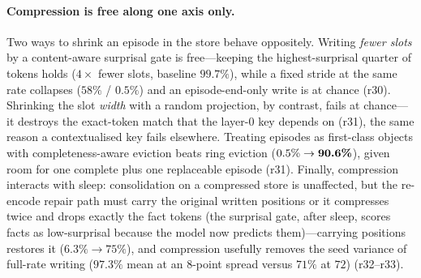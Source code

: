\paragraph{Compression is free along one axis only.} Two ways to shrink an episode in
the store behave oppositely. Writing \emph{fewer slots} by a content-aware surprisal gate
is free---keeping the highest-surprisal quarter of tokens holds 
($4\times$ fewer slots, baseline $99.7\%$), while a fixed stride at the same rate
collapses ($58\%$ / $0.5\%$) and an episode-end-only write is at chance (r30). Shrinking
the slot \emph{width} with a random projection, by contrast, fails at chance---it
destroys the exact-token match that the layer-0 key depends on (r31), the same reason a
contextualised key fails elsewhere. Treating episodes as first-class objects with
completeness-aware eviction beats ring eviction ($0.5\%\to\textbf{90.6\%}$), given room for
one complete plus one replaceable episode (r31). Finally, compression interacts with
sleep: consolidation on a compressed store is unaffected, but the re-encode repair path
must carry the original written positions or it compresses twice and drops exactly the
fact tokens (the surprisal gate, after sleep, scores facts as low-surprisal because the
model now predicts them)---carrying positions restores it ($6.3\%\to75\%$), and
compression usefully removes the seed variance of full-rate writing ($97.3\%$ mean at an
$8$-point spread versus $71\%$ at $72$) (r32--r33).
